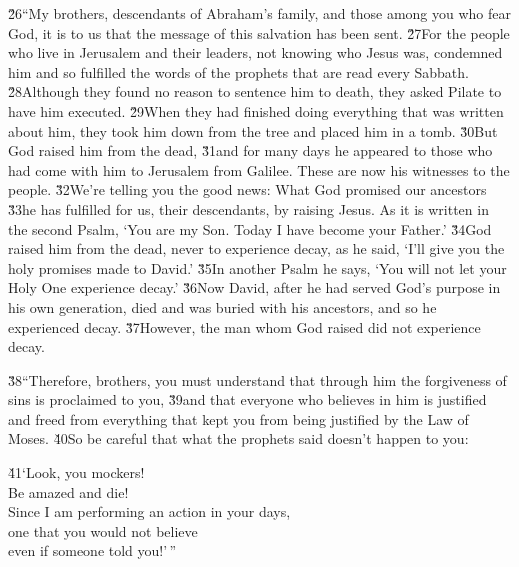 \v{26}``My brothers, descendants of Abraham's family, and those among you who fear God, it is to us that the message of this salvation has been sent. \v{27}For the people who live in Jerusalem and their leaders, not knowing who Jesus was, condemned him and so fulfilled the words of the prophets that are read every Sabbath. \v{28}Although they found no reason to sentence him to death, they asked Pilate to have him executed. \v{29}When they had finished doing everything that was written about him, they took him down from the tree and placed him in a tomb. \v{30}But God raised him from the dead, \v{31}and for many days he appeared to those who had come with him to Jerusalem from Galilee. These are now his witnesses to the people. \v{32}We're telling you the good news: What God promised our ancestors \v{33}he has fulfilled for us, their descendants, by raising Jesus. As it is written in the second Psalm, `You are my Son. Today I have become your Father.' \v{34}God raised him from the dead, never to experience decay, as he said, `I'll give you the holy promises made to David.' \v{35}In another Psalm he says, `You will not let your Holy One experience decay.' \v{36}Now David, after he had served God's purpose in his own generation, died and was buried with his ancestors, and so he experienced decay. \v{37}However, the man whom God raised did not experience decay.

\v{38}``Therefore, brothers, you must understand that through him the forgiveness of sins is proclaimed to you, \v{39}and that everyone who believes in him is justified and freed from everything that kept you from being justified by the Law of Moses. \v{40}So be careful that what the prophets said doesn't happen to you:

\begin{poetry}
\poeml \v{41}`Look, you mockers! \\
\poemll    Be amazed and die! \\
\poeml Since I am performing an action in your days, \\
\poemll    one that you would not believe \\
\poemlll       even if someone told you!'\,''
\end{poetry}

